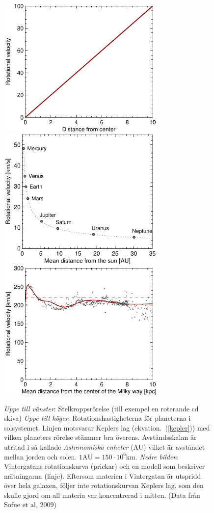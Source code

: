 \begin{figure}[h]
\begin{center}
\includegraphics[width=8.2cm]{../figures/cdrot.pdf}
\includegraphics[width=8.2cm]{../figures/solsystrot.pdf}
\includegraphics[width=8.2cm]{../figures/mwrot.pdf}
\end{center}
\caption{\emph{Uppe till vänster}: Stelkroppsrörelse (till exempel
  en roterande cd skiva) \emph{Uppe till höger}:
  Rotationshastigheterna för planeterna i solsystemet. Linjen
  motsvarar Keplers lag (ekvation.~(\ref{kepler})) med vilken
  planeters rörelse stämmer bra överens. Avståndsskalan är utritad i
  så kallade \emph{Astronomiska enheter} (AU) vilket är avståndet
  mellan jorden och solen. $1 \text{AU}=150\cdot 10^6
  \text{km}$. \emph{Nedre bilden}: Vintergatans rotationskurva
  (prickar) och en modell som beskriver mätningarna (linje). Eftersom
  materien i Vintergatan är utspridd över hela galaxen, följer inte
  rotationskurvan Keplers lag, som den skulle gjord om all materia var
  koncentrerad i mitten. (Data från Sofue et al, 2009) }
\label{rotcurve}
\end{figure}  


